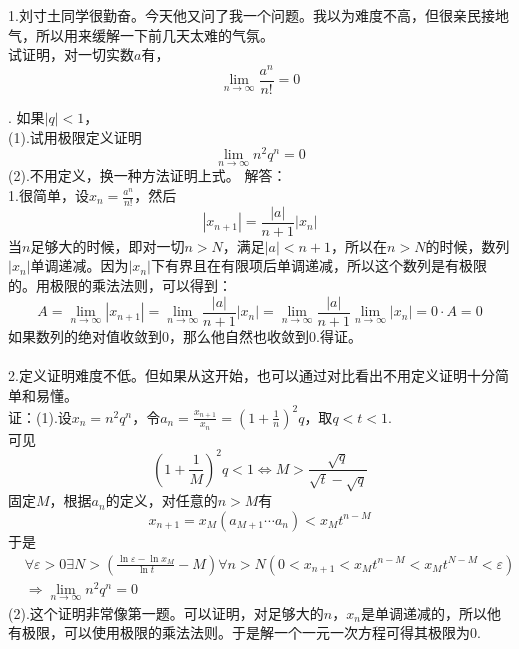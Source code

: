 \documentclass[11pt,a4paper,openany]{article}
\begin{document}
\noindent 1.刘寸土同学很勤奋。今天他又问了我一个问题。我以为难度不高，但很亲民接地气，所以用来缓解一下前几天太难的气氛。\\
试证明，对一切实数$a$有，
\[
\lim_{n\rightarrow \infty}
\frac{a^n}{n!}=0
\]

.
如果$|q|<1$，\\
(1).试用极限定义证明
\[
\lim_{n\rightarrow\infty} n^2 q^n=0
\]
(2).不用定义，换一种方法证明上式。
\newpage
解答：\\
1.很简单，设$\displaystyle{x_n=\frac{a^n}{n!}}$，然后\\
\[
|x_{n+1}|
=\frac{|a|}{n+1}|x_n|
\]
当$n$足够大的时候，即对一切$n>N$，满足$|a|<n+1$，所以在$n>N$的时候，数列$|x_n|$单调递减。因为$|x_n|$下有界且在有限项后单调递减，所以这个数列是有极限的。用极限的乘法法则，可以得到：
\[
A=\lim_{n\rightarrow \infty}
|x_{n+1}|=
\lim_{n\rightarrow \infty}
\frac{|a|}{n+1}|x_n|
=\lim_{n\rightarrow \infty}
\frac{|a|}{n+1}\lim_{n\rightarrow \infty}|x_n|=0 \cdot A=0
\]
如果数列的绝对值收敛到0，那么他自然也收敛到0.得证。\\
\\
2.定义证明难度不低。但如果从这开始，也可以通过对比看出不用定义证明十分简单和易懂。\\
证：(1).设$x_n=n^2 q^n$，令$\displaystyle{a_n=\frac{x_{n+1}}{x_n}=\left(1+\frac{1}{n}\right)^2 q}$，取$q<t<1$.\\
可见
\[
\left(1+\frac{1}{M}\right)^2 q<1
\Leftrightarrow
M>\frac{\sqrt{q}}{\sqrt{t}-\sqrt{q}}
\]
固定$M$，根据$a_n$的定义，对任意的$n>M$有
\[
x_{n+1}=x_M(a_{M+1}\cdots a_n)<x_M t^{n-M}
\]
于是
\[
\begin{split}
&
\forall \varepsilon >0 \exists N>\left(\frac{\ln \varepsilon-\ln x_M}{\ln t}-M\right) \forall n>N \left(0<x_{n+1}<x_M t^{n-M}<x_M t^{N-M}<\varepsilon \right)\\
&\Rightarrow
\lim_{n\rightarrow \infty}n^2 q^n=0
\end{split}
\]
(2).这个证明非常像第一题。可以证明，对足够大的$n$，$x_n$是单调递减的，所以他有极限，可以使用极限的乘法法则。于是解一个一元一次方程可得其极限为0.
\end{document}
